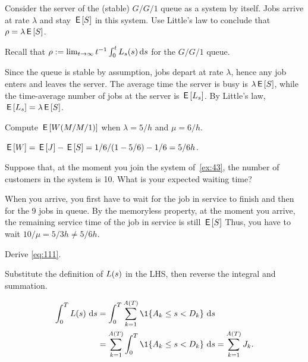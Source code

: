 \begin{exercise}\label{ex:37}
 Consider the server of the (stable) $G/G/1$ queue as a system by itself.
Jobs arrive at rate $\lambda$ and stay $\,\mathsf{E}\left[S\right]$ in this system.
Use  Little's law to conclude that  $\rho = \lambda  \,\mathsf{E}\left[S\right]$.
\begin{hint}
Recall that  $\rho := \lim_{t\to\infty} t^{-1}\int_0^t L_s(s)\,\textrm{d}s$ for the $G/G/1$ queue.
\end{hint}
\begin{solution}
Since the queue is stable by assumption, jobs depart at rate $\lambda$, hence any job enters and leaves the server. The average time the server is busy is $\lambda \,\mathsf{E}\left[S\right]$, while the time-average number of jobs at the server is $\,\mathsf{E}\left[L_s\right]$. By Little's law, $\,\mathsf{E}\left[L_s\right] = \lambda \,\mathsf{E}\left[S\right]$.
\end{solution}
\end{exercise}


\begin{exercise}\label{ex:43}
Compute $\,\mathsf{E}\left[W(M/M/1)\right]$  when $\lambda=5/h$ and $\mu=6/h$.
\begin{solution}
$\,\mathsf{E}\left[W\right] = \,\mathsf{E}\left[J\right] - \,\mathsf{E}\left[S\right] = 1/6/(1-5/6) - 1/6 = 5/6h$.
\end{solution}
\end{exercise}

\begin{exercise}\label{ex:44}
 Suppose that, at the moment you join the system of~\cref{ex:43}, the number of customers in the system is 10.
What is your  expected waiting time?
\begin{solution}
When you arrive, you first have to wait for the job in service to finish and then for the 9 jobs in queue.
By the memoryless property, at the moment you arrive, the remaining service time of the job in service is still $\,\mathsf{E}\left[S\right]$ Thus, you have to wait $10/\mu = 5/3 h \neq 5/6 h$.
\end{solution}
\end{exercise}



\begin{exercise}\label{ex:59}
Derive \cref{eq:111}.
\begin{hint}
 Substitute the definition of $L(s)$ in the LHS, then reverse the integral and summation.
\end{hint}
\begin{solution}
\begin{equation*}
 \begin{split}
 \int_0^T \L(s)\, \d s & = \int_0^T \sum_{k=1}^{A(T)} \1{A_k \leq s < D_k}\, \d s \\
& = \sum_{k=1}^{A(T)}\int_0^T \1{A_k \leq s < D_k}\, \d s = \sum_{k=1}^{A(T)} \J_k.
 \end{split}
\end{equation*}
\end{solution}
\end{exercise}


